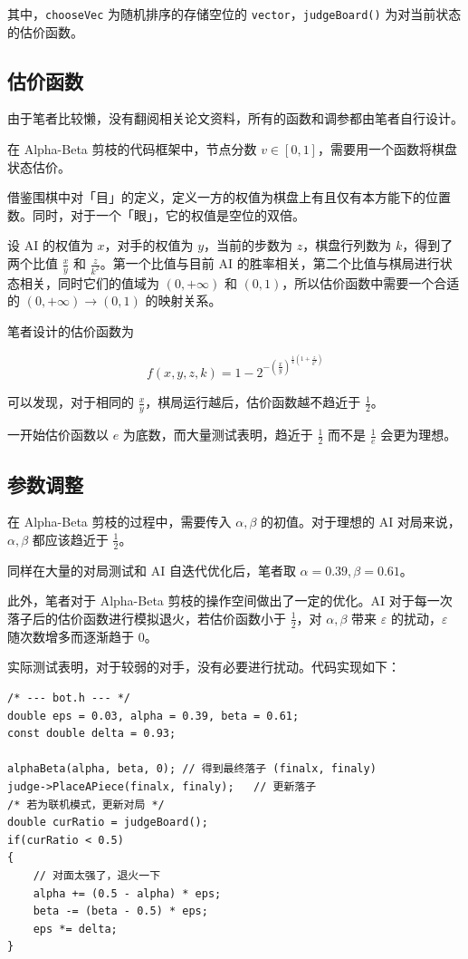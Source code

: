 \documentclass{noithesis}
\begin{document}
	其中，\verb|chooseVec| 为随机排序的存储空位的 \verb|vector|，\verb|judgeBoard()| 为对当前状态的估价函数。

	\subsection{估价函数}
	
	由于笔者比较懒，没有翻阅相关论文资料，所有的函数和调参都由笔者自行设计。
	
	在 Alpha-Beta 剪枝的代码框架中，节点分数 $v \in [0, 1]$，需要用一个函数将棋盘状态估价。
	
	借鉴围棋中对「目」的定义，定义一方的权值为棋盘上有且仅有本方能下的位置数。同时，对于一个「眼」，它的权值是空位的双倍。
	
	设 AI 的权值为 $x$，对手的权值为 $y$，当前的步数为 $z$，棋盘行列数为 $k$，得到了两个比值 $\frac xy$ 和 $\frac z{k^2}$。第一个比值与目前 AI 的胜率相关，第二个比值与棋局进行状态相关，同时它们的值域为 $(0,+\infty)$ 和 $(0,1)$，所以估价函数中需要一个合适的 $(0, +\infty) \to (0, 1)$ 的映射关系。
	
	笔者设计的估价函数为
	
	\begin{displaymath}
		f(x, y, z, k) = 1 - 2 ^ {-(\frac xy) ^ {\frac 14 \left(1+\frac{z}{k^2}\right)}} 
	\end{displaymath}

	可以发现，对于相同的 $\frac xy$，棋局运行越后，估价函数越不趋近于 $\frac 12$。
	
	一开始估价函数以 $e$ 为底数，而大量测试表明，趋近于 $\frac 12$ 而不是 $\frac 1e$ 会更为理想。
		
	\subsection{参数调整}
	
	在 Alpha-Beta 剪枝的过程中，需要传入 $\alpha, \beta$ 的初值。对于理想的 AI 对局来说，$\alpha, \beta$ 都应该趋近于 $\frac 12$。
	
	同样在大量的对局测试和 AI 自迭代优化后，笔者取 $\alpha = 0.39,\beta = 0.61$。
	
	此外，笔者对于 Alpha-Beta 剪枝的操作空间做出了一定的优化。AI 对于每一次落子后的估价函数进行模拟退火，若估价函数小于 $\frac 12$，对 $\alpha, \beta$ 带来 $\varepsilon$ 的扰动，$\varepsilon$ 随次数增多而逐渐趋于 $0$。
	
	实际测试表明，对于较弱的对手，没有必要进行扰动。代码实现如下：
	
	\begin{lstlisting}
/* --- bot.h --- */
double eps = 0.03, alpha = 0.39, beta = 0.61;
const double delta = 0.93;

alphaBeta(alpha, beta, 0); // 得到最终落子 (finalx, finaly)
judge->PlaceAPiece(finalx, finaly);   // 更新落子
/* 若为联机模式，更新对局 */
double curRatio = judgeBoard();
if(curRatio < 0.5)
{
	// 对面太强了，退火一下
	alpha += (0.5 - alpha) * eps;
	beta -= (beta - 0.5) * eps;
	eps *= delta;
}
	\end{lstlisting}
\end{document}
